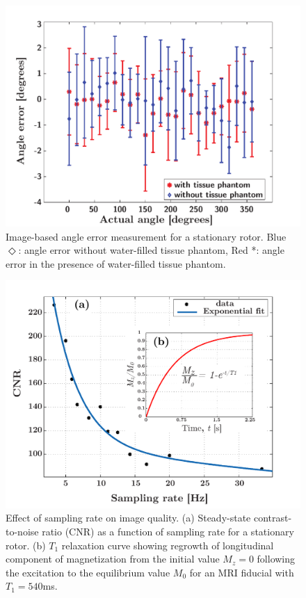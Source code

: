 \documentclass[journal]{IEEEtran}
\begin{document}
\begin{figure}
			\includegraphics[width=1.0\columnwidth]{Figure10.pdf}
		
\caption{Image-based angle error measurement for a stationary rotor. Blue $\Diamond$: angle error without water-filled tissue phantom, Red *: angle error in the presence of water-filled tissue phantom. \label{fig:localization-results} }

\end{figure}

\begin{figure}
		\includegraphics[width=1.0\columnwidth]{Figure11.pdf}

\caption{Effect of sampling rate on image quality. (a) Steady-state contrast-to-noise ratio (CNR) as a function of sampling rate for a stationary rotor. (b) $T_1$ relaxation curve showing regrowth of longitudinal component of magnetization from the initial value $M_z = 0$ following the excitation to the equilibrium value $M_0$ for an MRI fiducial with $T_1 = 540$ms.}
\label{fig:CNR-Vs-SamplingRate}

\end{figure}
\end{document}
